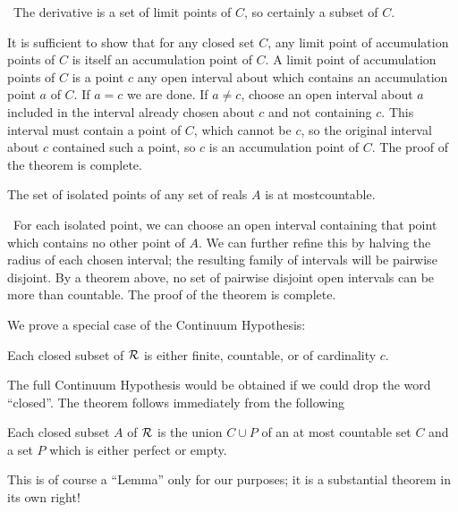 \preuve\ The derivative is a set of limit points of $C$, so
certainly a subset of $C$.

It is sufficient to show that for any closed set $C$, any limit point
of accumulation points of $C$ is itself an accumulation point of $C$.
A limit point of accumulation points of $C$ is a point $c$ any open
interval about which contains an accumulation point $a$ of $C$.  If
$a=c$ we are done.  If $a\neq c$, choose an open interval about $a$
included in the interval already chosen about $c$ and not containing
$c$.  This interval must contain a point of $C$, which cannot be $c$,
so the original interval about $c$ contained such a point, so $c$ is
an accumulation point of $C$.  The proof of the theorem is complete.
\finpreuve

\begin{thm}
 The set of isolated points of any set of reals $A$
 is at most\linebreak countable.
\end{thm}

\preuve\ For each isolated point, we can choose an open interval
containing that point which contains no other point of $A$.  We can
further refine this by halving the radius of each chosen interval; the
resulting family of intervals will be pairwise
disjoint.  By a theorem above, no set of pairwise
disjoint open intervals can be more than countable.  The proof of the theorem
is complete.
\finpreuve

We prove a special case of the Continuum Hypothesis:

\begin{thm}
 Each closed subset of $\cal R$ is either finite,
 countable, or of cardinality $c$.
\end{thm}

The full Continuum Hypothesis would be obtained if we could drop the
word ``closed''.  The theorem follows immediately from the following

\begin{lemme}
 Each closed subset $A$ of $\cal R$ is the union $C \cup
 P$ of an at most countable set $C$ and a set $P$ which is
 either perfect or empty.
\end{lemme}

This is of course a ``Lemma'' only for our purposes; it is a
substantial theorem in its own right!

